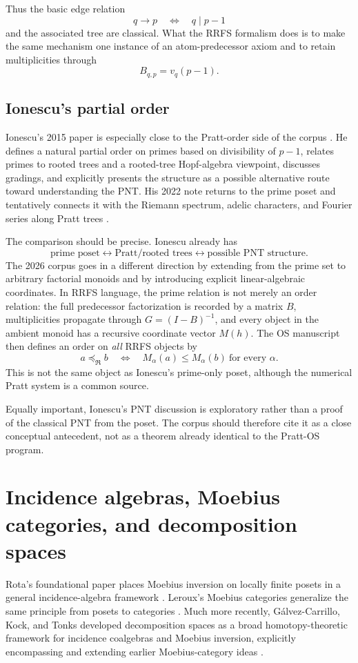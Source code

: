 \documentclass[11pt]{article}
\newcommand{\cR}{\mathfrak R}
\begin{document}
Thus the basic edge relation
\[
 q\to p\quad\Longleftrightarrow\quad q\mid p-1
\]
and the associated tree are classical. What the RRFS formalism does is to make the same mechanism one instance of an atom-predecessor axiom and to retain multiplicities through
\[
 B_{q,p}=v_q(p-1).
\]

\subsection{Ionescu's partial order}
Ionescu's 2015 paper is especially close to the Pratt-order side of the corpus \cite{Ionescu2015}. He defines a natural partial order on primes based on divisibility of $p-1$, relates primes to rooted trees and a rooted-tree Hopf-algebra viewpoint, discusses gradings, and explicitly presents the structure as a possible alternative route toward understanding the PNT. His 2022 note returns to the prime poset and tentatively connects it with the Riemann spectrum, adelic characters, and Fourier series along Pratt trees \cite{Ionescu2022}.

The comparison should be precise. Ionescu already has
\[
 \text{prime poset}\leftrightarrow\text{Pratt/rooted trees}\leftrightarrow
 \text{possible PNT structure}.
\]
The 2026 corpus goes in a different direction by extending from the prime set to arbitrary factorial monoids and by introducing explicit linear-algebraic coordinates. In RRFS language, the prime relation is not merely an order relation: the full predecessor factorization is recorded by a matrix $B$, multiplicities propagate through $G=(I-B)^{-1}$, and every object in the ambient monoid has a recursive coordinate vector $M(h)$. The OS manuscript then defines an order on \emph{all} RRFS objects by
\[
 a\preceq_{\cR} b\quad\Longleftrightarrow\quad
 M_\alpha(a)\le M_\alpha(b)\ \text{for every }\alpha.
\]
This is not the same object as Ionescu's prime-only poset, although the numerical Pratt system is a common source.

Equally important, Ionescu's PNT discussion is exploratory rather than a proof of the classical PNT from the poset. The corpus should therefore cite it as a close conceptual antecedent, not as a theorem already identical to the Pratt-OS program.

\section{Incidence algebras, Moebius categories, and decomposition spaces}
Rota's foundational paper places Moebius inversion on locally finite posets in a general incidence-algebra framework \cite{Rota1964}. Leroux's Moebius categories generalize the same principle from posets to categories \cite{Leroux1975}. Much more recently, G\'alvez-Carrillo, Kock, and Tonks developed decomposition spaces as a broad homotopy-theoretic framework for incidence coalgebras and Moebius inversion, explicitly encompassing and extending earlier Moebius-category ideas \cite{GKT1,GKT2,GKT3}.
\end{document}
